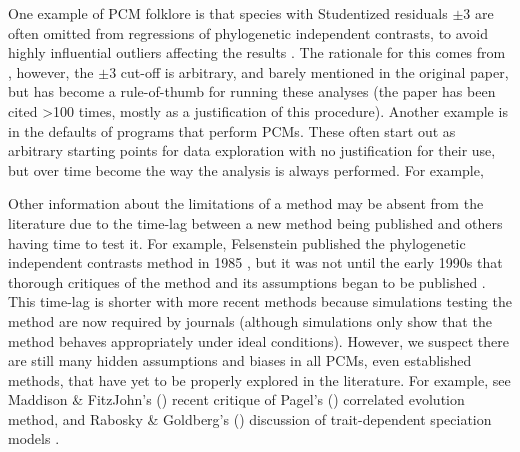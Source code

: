 \documentclass[a4paper,12pt]{article}
\begin{document}
    One example of PCM folklore is that species with Studentized residuals $\pm 3$ are often omitted from regressions of phylogenetic independent contrasts, to avoid highly influential outliers affecting the results \citep[e.g.][]{GEB:GEB355}. 
    The rationale for this comes from \citet{jones1997optimum}, however, the $\pm 3$ cut-off is arbitrary, and barely mentioned in the original paper, but has become a rule-of-thumb for running these analyses (the paper has been cited \textgreater 100 times, mostly as a justification of this procedure).
    Another example is in the defaults of programs that perform PCMs. 
    These often start out as arbitrary starting points for data exploration with no justification for their use, but over time become the way the analysis is always performed.
    For example, %

    Other information about the limitations of a method may be absent from the literature due to the time-lag between a new method being published and others having time to test it. 
    For example, Felsenstein published the phylogenetic independent contrasts method in 1985 \citep{felsenstein1985phylogenies}, but it was not until the early 1990s that thorough critiques of the method and its assumptions began to be published \citep[e.g.][]{garland1992procedures}.
    This time-lag is shorter with more recent methods because simulations testing the method are now required by journals (although simulations only show that the method behaves appropriately under ideal conditions).
    However, we suspect there are still many hidden assumptions and biases in all PCMs, even established methods, that have yet to be properly explored in the literature.
    For example, see Maddison \& FitzJohn's (\citeyear{maddison2014unsolved}) recent critique of Pagel's (\citeyear{pagel1994detecting}) correlated evolution method, and Rabosky \& Goldberg's (\citeyear{rabosky2015model}) discussion of trait-dependent speciation models \citep{nee1994reconstructed,maddison2007estimating}.
\end{document}

